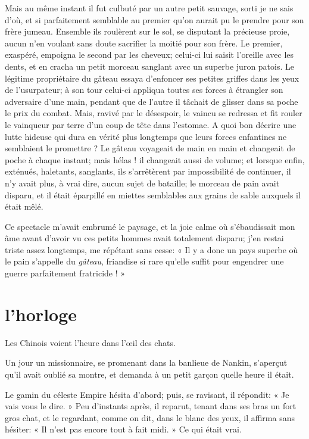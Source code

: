 Mais au même instant il fut culbuté par un autre petit sauvage, sorti je
ne sais d’où, et si parfaitement semblable au premier
qu’on aurait pu le prendre pour son frère jumeau.
Ensemble ils roulèrent sur le sol, se disputant la précieuse proie,
aucun n’en voulant sans doute sacrifier la moitié pour
son frère. Le premier, exaspéré, empoigna le second par les cheveux;
celui{}-ci lui saisit l’oreille avec les dents, et en
cracha un petit morceau sanglant avec un superbe juron patois. Le
légitime propriétaire du gâteau essaya d’enfoncer ses
petites griffes dans les yeux de l’usurpateur; à son
tour celui{}-ci appliqua toutes ses forces à étrangler son adversaire
d’une main, pendant que de l’autre il
tâchait de glisser dans sa poche le prix du combat. Mais, ravivé par le
désespoir, le vaincu se redressa et fit rouler le vainqueur par terre
d’un coup de tête dans l’estomac. A
quoi bon décrire une lutte hideuse qui dura en vérité plus longtemps
que leurs forces enfantines ne semblaient le promettre ? Le gâteau
voyageait de main en main et changeait de poche à chaque instant; mais
hélas ! il changeait aussi de volume; et lorsque enfin, exténués,
haletants, sanglants, ils s’arrêtèrent par
impossibilité de continuer, il n’y avait plus, à vrai
dire, aucun sujet de bataille; le morceau de pain avait disparu, et il
était éparpillé en miettes semblables aux grains de sable auxquels il
était mêlé.

Ce spectacle m’avait embrumé le paysage, et la joie
calme où s’ébaudissait mon âme avant
d’avoir vu ces petits hommes avait totalement disparu;
j’en restai triste assez longtemps, me répétant sans
cesse: « Il y a donc un pays superbe où le pain
s’appelle du \textit{gâteau}, friandise si rare
qu’elle suffit pour engendrer une guerre parfaitement
fratricide ! »

\quebra\section[L’horloge]{l’horloge}

Les Chinois voient l’heure dans l’\oe il
des chats.

Un jour un missionnaire, se promenant dans la banlieue de Nankin,
s’aperçut qu’il avait oublié sa
montre, et demanda à un petit garçon quelle heure il était.

Le gamin du céleste Empire hésita d’abord; puis, se
ravisant, il répondit: « Je vais vous le dire. » Peu
d’instants après, il reparut, tenant dans ses bras un
fort gros chat, et le regardant, comme on dit, dans le blanc des yeux,
il affirma sans hésiter: « Il n’est pas encore tout à
fait midi. » Ce qui était vrai.

